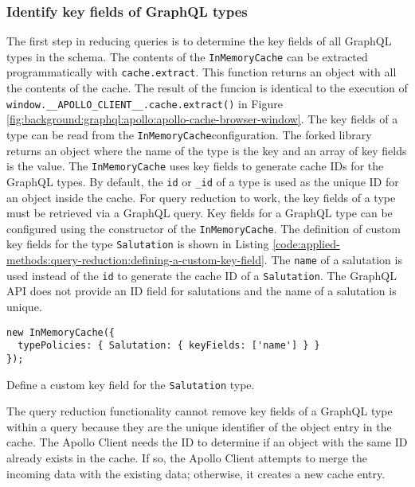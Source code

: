 \subsubsection{Identify key fields of GraphQL types}

The first step in reducing queries is to determine the key fields of all GraphQL types in the schema. The contents of the \texttt{InMemoryCache} can be extracted programmatically with \texttt{cache.extract}. This function returns an object with all the contents of the cache. The result of the funcion is identical to the execution of \texttt{window.\_\_APOLLO\_CLIENT\_\_.cache.extract()} in Figure \ref{fig:background:graphql:apollo:apollo-cache-browser-window}. The key fields of a type can be read from the \texttt{InMemoryCache}configuration. The forked library returns an object where the name of the type is the key and an array of key fields is the value. The \texttt{InMemoryCache} uses key fields to generate cache \acp{ID} for the GraphQL types. By default, the \texttt{id} or \texttt{\_id} of a type is used as the unique \ac{ID} for an object inside the cache. For query reduction to work, the key fields of a type must be retrieved via a GraphQL query. Key fields for a GraphQL type can be configured using the constructor of the \texttt{InMemoryCache}. The definition of custom key fields for the type \texttt{Salutation} is shown in Listing \ref{code:applied-methods:query-reduction:defining-a-custom-key-field}. The \texttt{name} of a salutation is used instead of the \texttt{id} to generate the cache \ac{ID} of a \texttt{Salutation}. The GraphQL \ac{API} does not provide an \ac{ID} field for salutations and the name of a salutation is unique. \cite{misc:-:background:graphql:apollo-client-cache-configuration}

\ifshowListings
\begin{listing}[H]
  \begin{verbatim}
new InMemoryCache({
  typePolicies: { Salutation: { keyFields: ['name'] } }
});
  \end{verbatim}
  \caption{Define a custom key field for the \texttt{Salutation} type.}\label{code:applied-methods:query-reduction:defining-a-custom-key-field}
\end{listing}
\fi

\noindent The query reduction functionality cannot remove key fields of a GraphQL type within a query because they are the unique identifier of the object entry in the cache. The Apollo Client needs the \ac{ID} to determine if an object with the same \ac{ID} already exists in the cache. If so, the Apollo Client attempts to merge the incoming data with the existing data; otherwise, it creates a new cache entry.

